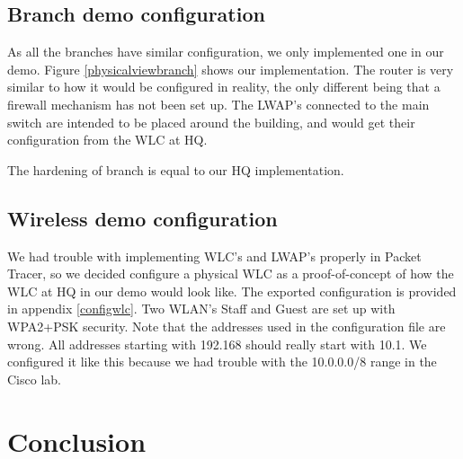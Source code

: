 \subsection{Branch demo configuration}


As all the branches have similar configuration, we only implemented one in our demo. Figure \ref{physicalviewbranch} shows our implementation. %
The router is very similar to how it would be configured in reality, the only different being that a firewall mechanism has not been set up. The LWAP's connected to the main switch are intended to be placed around the building, and would get their configuration from the WLC at HQ.

The hardening of branch is equal to our HQ implementation.

\subsection{Wireless demo configuration} \label{demowireless}

We had trouble with implementing WLC's and LWAP's properly in Packet Tracer, so we decided configure a physical WLC as a proof-of-concept of how the WLC at HQ in our demo would look like. The exported configuration is provided in appendix \ref{configwlc}. Two WLAN's Staff and Guest are set up with WPA2+PSK security. Note that the addresses used in the configuration file are wrong. All addresses starting with 192.168 should really start with 10.1. We configured it like this because we had trouble with the 10.0.0.0/8 range in the Cisco lab.

\section{Conclusion}



\clearpage %

\nocite{*}





